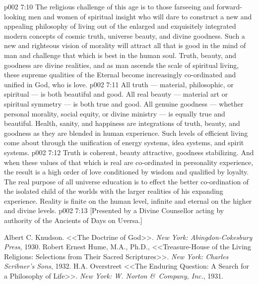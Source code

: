 \vs p002 7:10 The religious challenge of this age is to those farseeing and forward\hyp{}looking men and women of spiritual insight who will dare to construct a new and appealing philosophy of living out of the enlarged and exquisitely integrated modern concepts of cosmic truth, universe beauty, and divine goodness. Such a new and righteous vision of morality will attract all that is good in the mind of man and challenge that which is best in the human soul. Truth, beauty, and goodness are divine realities, and as man ascends the scale of spiritual living, these supreme qualities of the Eternal become increasingly co\hyp{}ordinated and unified in God, who is love.
\vs p002 7:11 \pc All truth --- material, philosophic, or spiritual --- is both beautiful and good. All real beauty --- material art or spiritual symmetry --- is both true and good. All genuine goodness --- whether personal morality, social equity, or divine ministry --- is equally true and beautiful. Health, sanity, and happiness are integrations of truth, beauty, and goodness as they are blended in human experience. Such levels of efficient living come about through the unification of energy systems, idea systems, and spirit systems.
\vs p002 7:12 Truth is coherent, beauty attractive, goodness stabilizing. And when these values of that which is real are co\hyp{}ordinated in personality experience, the result is a high order of love conditioned by wisdom and qualified by loyalty. The real purpose of all universe education is to effect the better co\hyp{}ordination of the isolated child of the worlds with the larger realities of his expanding experience. Reality is finite on the human level, infinite and eternal on the higher and divine levels.
\vsetoff
\vs p002 7:13 [Presented by a Divine Counsellor acting by authority of the Ancients of Days on Uversa.]
\quizlink
\begin{thebibliography}{100}
Albert C. Knudson.
{<<The Doctrine of God>>.}
{\em New York: Abingdon-Cokesbury Press}, 1930.
Robert Ernest Hume, M.A., Ph.D.,
{<<Treasure\hyp{}House of the Living Religions: Selections from Their Sacred Scriptures>>.}
{\em New York: Charles Scribner's Sons}, 1932.
H.A. Overstreet
{<<The Enduring Question: A Search for a Philosophy of Life>>.}
{\em New York: W. Norton \&\ Company, Inc.}, 1931.
\end{thebibliography}

